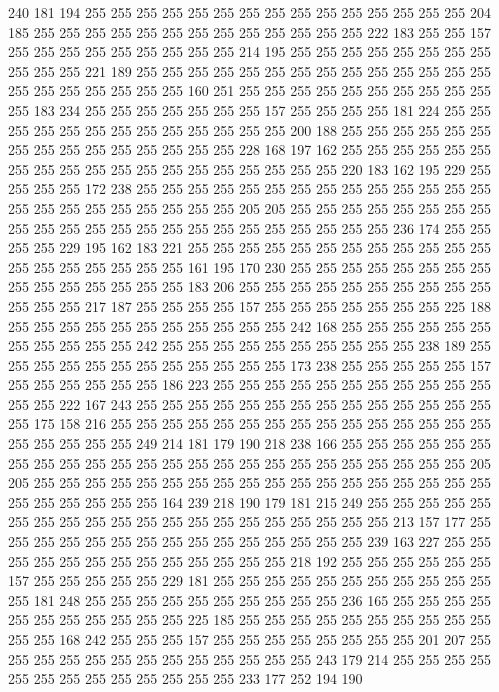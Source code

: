 240 181 194 255 255 255 255 255 255 255 255 255 255 255 255 255 255 255 204 185
255 255 255 255 255 255 255 255 255 255 255 255 255 222 183 255 255 157 255 255
255 255 255 255 255 255 255 214 195 255 255 255 255 255 255 255 255 255 255 255
221 189 255 255 255 255 255 255 255 255 255 255 255 255 255 255 255 255 255 255
255 255 255 160 251 255 255 255 255 255 255 255 255 255 255 255 183 234 255 255
255 255 255 255 255 157 255 255 255 255 181 224 255 255 255 255 255 255 255 255
255 255 255 255 255 200 188 255 255 255 255 255 255 255 255 255 255 255 255 255
255 255 228 168 197 162 255 255 255 255 255 255 255 255 255 255 255 255 255 255
255 255 255 255 255 220 183 162 195 229 255 255 255 255 172 238 255 255 255 255
255 255 255 255 255 255 255 255 255 255 255 255 255 255 255 255 255 255 255 205
205 255 255 255 255 255 255 255 255 255 255 255 255 255 255 255 255 255 255 255
255 255 255 255 236 174 255 255 255 255 229 195 162 183 221 255 255 255 255 255
255 255 255 255 255 255 255 255 255 255 255 255 255 255 161 195 170 230 255 255
255 255 255 255 255 255 255 255 255 255 255 255 255 183 206 255 255 255 255 255
255 255 255 255 255 255 255 255 217 187 255 255 255 255 157 255 255 255 255 255
255 255 225 188 255 255 255 255 255 255 255 255 255 255 255 242 168 255 255 255
255 255 255 255 255 255 255 255 242 255 255 255 255 255 255 255 255 255 255 238
189 255 255 255 255 255 255 255 255 255 255 255 255 173 238 255 255 255 255 255
157 255 255 255 255 255 255 186 223 255 255 255 255 255 255 255 255 255 255 255
255 255 222 167 243 255 255 255 255 255 255 255 255 255 255 255 255 255 255 255
175 158 216 255 255 255 255 255 255 255 255 255 255 255 255 255 255 255 255 255
255 255 255 249 214 181 179 190 218 238 166 255 255 255 255 255 255 255 255 255
255 255 255 255 255 255 255 255 255 255 255 255 255 255 255 205 205 255 255 255
255 255 255 255 255 255 255 255 255 255 255 255 255 255 255 255 255 255 255 255
255 164 239 218 190 179 181 215 249 255 255 255 255 255 255 255 255 255 255 255
255 255 255 255 255 255 255 255 255 213 157 177 255 255 255 255 255 255 255 255
255 255 255 255 255 255 255 239 163 227 255 255 255 255 255 255 255 255 255 255
255 255 255 218 192 255 255 255 255 255 255 157 255 255 255 255 255 229 181 255
255 255 255 255 255 255 255 255 255 255 255 181 248 255 255 255 255 255 255 255
255 255 255 236 165 255 255 255 255 255 255 255 255 255 255 255 225 185 255 255
255 255 255 255 255 255 255 255 255 255 168 242 255 255 255 157 255 255 255 255
255 255 255 255 201 207 255 255 255 255 255 255 255 255 255 255 255 255 255 243
179 214 255 255 255 255 255 255 255 255 255 255 255 255 255 233 177 252 194 190
